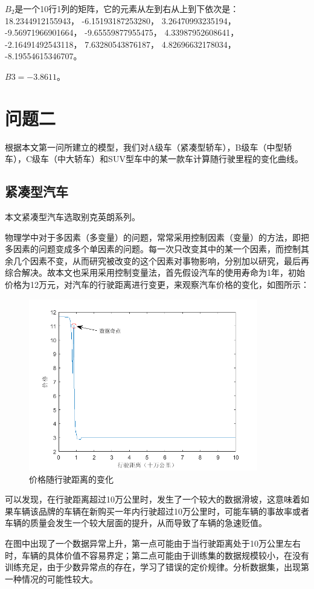 \documentclass{ctexart}
\newcounter{sub}
\begin{document}
$B_2$是一个10行1列的矩阵，它的元素从左到右从上到下依次是：
18.2344912155943，
-6.15193187253280，
3.26470993235194，
-9.56971966901664，
-9.65559877955475，
4.33987952608641，
-2.16491492543118，
7.63280543876187，
4.82696632178034，
-8.19554615346707。

$B3=-3.8611$。


\newpage
\section{问题二}%
\label{sec:问题二}

根据本文第一问所建立的模型，我们对A级车（紧凑型轿车），B级车（中型轿车），C级车（中大轿车）和SUV型车中的某一款车计算随行驶里程的变化曲线。
\subsection{紧凑型汽车}
本文紧凑型汽车选取别克英朗系列。

物理学中对于多因素（多变量）的问题，常常采用控制因素（变量）的方法，即把多因素的问题变成多个单因素的问题。每一次只改变其中的某一个因素，而控制其余几个因素不变，从而研究被改变的这个因素对事物影响，分别加以研究，最后再综合解决。故本文也采用采用控制变量法，首先假设汽车的使用寿命为1年，初始价格为12万元，对汽车的行驶距离进行变更，来观察汽车价格的变化，如图所示：
\renewcommand\figurename{图}
\begin{figure}[H]
	\centering
	\includegraphics[width=10cm]{one.png}
	\caption{价格随行驶距离的变化} \label{all}
\end{figure}

可以发现，在行驶距离超过10万公里时，发生了一个较大的数据滑坡，这意味着如果车辆该品牌的车辆在新购买一年内行驶超过10万公里时，可能车辆的事故率或者车辆的质量会发生一个较大层面的提升，从而导致了车辆的急速贬值。

在图中出现了一个数据异常上升，第一点可能由于当行驶距离处于10万公里左右时，车辆的具体价值不容易界定；第二点可能由于训练集的数据规模较小，在没有训练充足，由于少数异常点的存在，学习了错误的定价规律。分析数据集，出现第一种情况的可能性较大。
\end{document}
